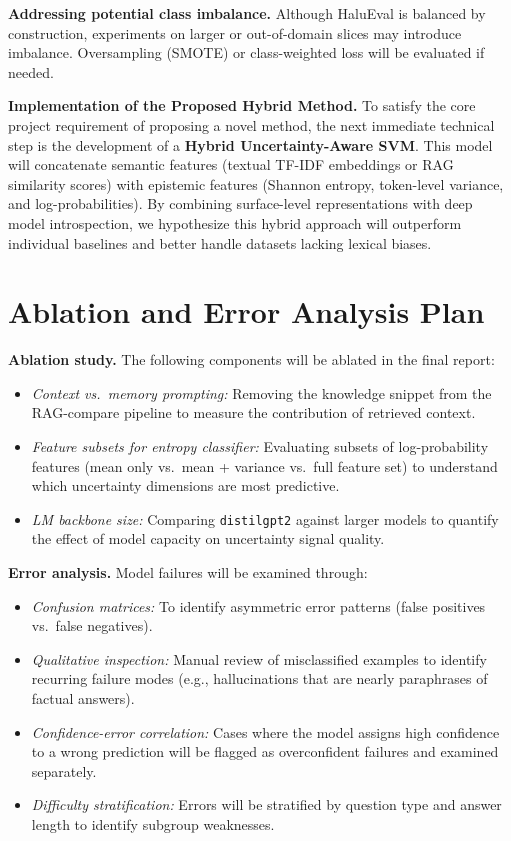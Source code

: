\documentclass[12pt,a4paper]{article}
\begin{document}
\textbf{Addressing potential class imbalance.} Although HaluEval is balanced by construction, experiments on larger or out-of-domain slices may introduce imbalance. Oversampling (SMOTE) or class-weighted loss will be evaluated if needed.

\textbf{Implementation of the Proposed Hybrid Method.} To satisfy the core project requirement of proposing a novel method, the next immediate technical step is the development of a \textbf{Hybrid Uncertainty-Aware SVM}. This model will concatenate semantic features (textual TF-IDF embeddings or RAG similarity scores) with epistemic features (Shannon entropy, token-level variance, and log-probabilities). By combining surface-level representations with deep model introspection, we hypothesize this hybrid approach will outperform individual baselines and better handle datasets lacking lexical biases.

\section{Ablation and Error Analysis Plan}

\textbf{Ablation study.}
The following components will be ablated in the final report:
\begin{itemize}
  \item \emph{Context vs.\ memory prompting:} Removing the knowledge snippet from the RAG-compare pipeline to measure the contribution of retrieved context.
  \item \emph{Feature subsets for entropy classifier:} Evaluating subsets of log-probability features (mean only vs.\ mean + variance vs.\ full feature set) to understand which uncertainty dimensions are most predictive.
  \item \emph{LM backbone size:} Comparing \texttt{distilgpt2} against larger models to quantify the effect of model capacity on uncertainty signal quality.
\end{itemize}

\textbf{Error analysis.}
Model failures will be examined through:
\begin{itemize}
  \item \emph{Confusion matrices:} To identify asymmetric error patterns (false positives vs.\ false negatives).
  \item \emph{Qualitative inspection:} Manual review of misclassified examples to identify recurring failure modes (e.g., hallucinations that are nearly paraphrases of factual answers).
  \item \emph{Confidence-error correlation:} Cases where the model assigns high confidence to a wrong prediction will be flagged as overconfident failures and examined separately.
  \item \emph{Difficulty stratification:} Errors will be stratified by question type and answer length to identify subgroup weaknesses.
\end{itemize}
\end{document}
